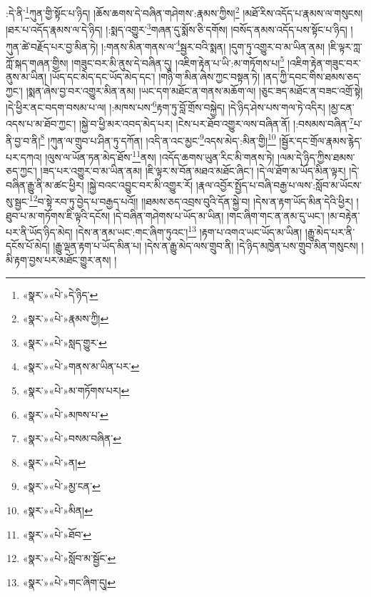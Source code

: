 :དེ་ནི་\footnote{«སྣར་»«པེ་»དེ་ཉིད་}ཀུན་གྱི་སྟོང་པ་ཉིད། །ཆོས་ཆགས་དེ་བཞིན་གཤེགས་:རྣམས་ཀྱིས།\footnote{«སྣར་»«པེ་»རྣམས་ཀྱི།} །མཐོ་རིས་འདོད་པ་རྣམས་ལ་གསུངས། །ཐར་པ་འདོད་རྣམས་ལ་དེ་ཉིད། །:སྨད་འགྱུར་\footnote{«སྣར་»«པེ་»སླད་གྱུར་}གཞན་དུ་སྨོས་ཅི་དགོས། །བསོད་ནམས་འདོད་པས་སྟོང་པ་ཉིད། །ཀུན་ཚེ་བརྗོད་པར་བྱ་མིན་ཏེ། །:གནས་མིན་གནས་ལ་\footnote{«སྣར་»«པེ་»གནས་མ་ཡིན་པར་}སྦྱར་བའི་སྨན། །དུག་ཏུ་འགྱུར་བ་མ་ཡིན་ནམ། །ཇི་ལྟར་ཀླ་ཀློ་སྐད་གཞན་གྱིས། །གཟུང་བར་མི་ནུས་དེ་བཞིན་དུ། །འཇིག་རྟེན་པ་ཡི་:མ་གཏོགས་པ།\footnote{«སྣར་»«པེ་»མ་གཏོགས་པར།} །འཇིག་རྟེན་གཟུང་བར་ནུས་མ་ཡིན། །ཡོད་དང་མེད་དང་ཡོད་མེད་དང་། །གཉི་ག་མིན་ཞེས་ཀྱང་བསྟན་ཏེ། །ནད་ཀྱི་དབང་གིས་ཐམས་ཅད་ཀྱང་། །སྨན་ཞེས་བྱ་བར་འགྱུར་མིན་ནམ། །ཡང་དག་མཐོང་ན་གནས་མཆོག་ལ། །ཅུང་ཟད་མཐོང་ན་བཟང་འགྲོ་སྟེ། །དེ་ཕྱིར་ནང་བདག་བསམ་པ་ལ། །:མཁས་པས་\footnote{«སྣར་»«པེ་»མཁས་པ་}རྟག་ཏུ་བློ་གྲོས་བསྐྱེད། །དེ་ཉིད་ཤེས་པས་གལ་ཏེ་འདིར། །མྱ་ངན་འདས་པ་མ་ཐོབ་ཀྱང་། །སྐྱེ་བ་ཕྱི་མར་འབད་མེད་པར། །ངེས་པར་ཐོབ་འགྱུར་ལས་བཞིན་ནོ། །:བསམས་བཞིན་\footnote{«སྣར་»«པེ་»བསམ་བཞིན་}པ་ནི་བྱ་བ་ནི།\footnote{«སྣར་»«པེ་»ན།} །ཀུན་ལ་གྲུབ་པ་ཤིན་ཏུ་དཀོན། །འདི་ན་འང་མྱང་\footnote{«སྣར་»«པེ་»མྱ་ངན་}འདས་མེད་:མིན་གྱི།\footnote{«སྣར་»«པེ་»མིན།} །སྦྱོར་དང་གྲོལ་རྣམས་རྙེད་པར་དཀའ། །ལུས་ལ་ཡོན་ཏན་མེད་ཐོས་\footnote{«སྣར་»«པེ་»ཐོབ་}ནས། །འདོད་ཆགས་ཡུན་རིང་མི་གནས་ཏེ། །ལམ་དེ་ཉིད་ཀྱིས་ཐམས་ཅད་ཀྱང་། །ཟད་པར་འགྱུར་བ་མ་ཡིན་ནམ། །ཇི་ལྟར་ས་བོན་མཐའ་མཐོང་ཞིང་། །དེ་ལ་ཐོག་མ་ཡོད་མིན་ལྟར། །དེ་བཞིན་རྒྱུ་ནི་མ་ཚང་ཕྱིར། །སྐྱེ་བའང་འབྱུང་བར་མི་འགྱུར་རོ། །རྣལ་འབྱོར་སྤྱོད་པ་བཞི་བརྒྱ་པ་ལས་:སློབ་མ་ཡོངས་སུ་སྦྱང་\footnote{«སྣར་»«པེ་»སློབ་མ་སྦྱོང་}བ་སྟེ་རབ་ཏུ་བྱེད་པ་བརྒྱད་པའོ།། །།ཐམས་ཅད་འབྲས་བུའི་དོན་སྐྱེ་བ། །དེས་ན་རྟག་ཡོད་མིན་དེའི་ཕྱིར། །ཐུབ་པ་མ་གཏོགས་ཇི་ལྟའི་དངོས། །དེ་བཞིན་གཤེགས་པ་ཡོད་མ་ཡིན། །གང་ཞིག་གང་ན་ནམ་དུ་ཡང་། །མ་བརྟེན་པར་ནི་ཡོད་ཉིད་མེད། །དེས་ན་ནམ་ཡང་:གང་ཞིག་ཏུའང་།\footnote{«སྣར་»«པེ་»གང་ཞིག་དུ།} །རྟག་པ་འགའ་ཡང་ཡོད་མ་ཡིན། །རྒྱུ་མེད་པར་ནི་དངོས་པོ་མེད། །རྒྱུ་ལྡན་རྟག་པ་ཡོད་མིན་པ། །དེས་ན་རྒྱུ་མེད་ལས་གྲུབ་ནི། །དེ་ཉིད་མཁྱེན་པས་གྲུབ་མིན་གསུངས། །མི་རྟག་བྱས་པར་མཐོང་གྱུར་ནས། །
